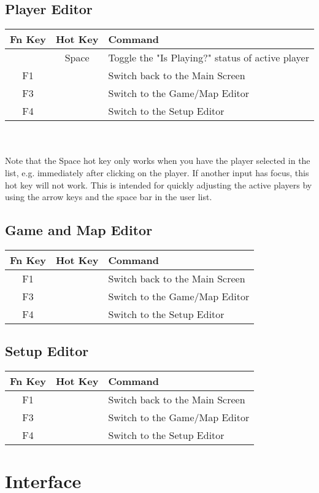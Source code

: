 \documentclass[10pt,a4paper]{report}
\begin{document}
\section{Player Editor}
\begin{tabular}{c|c|l}
Fn Key & Hot Key & Command \\
\hline
& Space & Toggle the "Is Playing?" status of active player \\
F1 & & Switch back to the Main Screen \\
F3 & & Switch to the Game/Map Editor \\
F4 & & Switch to the Setup Editor \\
\end{tabular}
\\
\\
Note that the Space hot key only works when you have the player selected in the list, e.g. immediately after clicking on the player.  If another input has focus, this hot key will not work.  This is intended for quickly adjusting the active players by using the arrow keys and the space bar in the user list.

\section{Game and Map Editor}
\begin{tabular}{c|c|l}
Fn Key & Hot Key & Command \\
\hline
F1 & & Switch back to the Main Screen \\
F3 & & Switch to the Game/Map Editor \\
F4 & & Switch to the Setup Editor \\
\end{tabular}

\section{Setup Editor}
\begin{tabular}{c|c|l}
Fn Key & Hot Key & Command \\
\hline
F1 & & Switch back to the Main Screen \\
F3 & & Switch to the Game/Map Editor \\
F4 & & Switch to the Setup Editor \\
\end{tabular}

\chapter{Interface}
\end{document}

